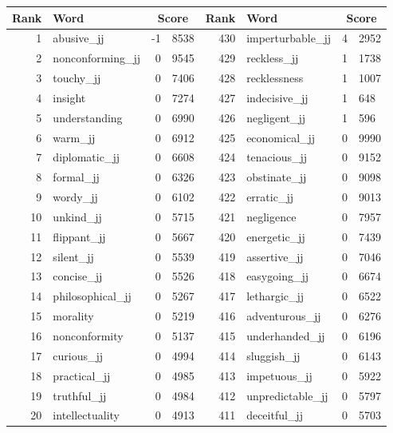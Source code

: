 \begin{table}[tbp]
    \begin{tabular}{| rlr@{.}l | rlr@{.}l |}
    \hline
    \textbf{Rank} & \textbf{Word} & \multicolumn{2}{c|}{\textbf{Score}} & \textbf{Rank} & \textbf{Word} & \multicolumn{2}{c|}{\textbf{Score}} \\
    \hline
    1 & abusive\_jj & -1 & 8538    &    430 & imperturbable\_jj & 4 & 2952 \\
    2 & nonconforming\_jj & 0 & 9545    &    429 & reckless\_jj & 1 & 1738 \\
    3 & touchy\_jj & 0 & 7406    &    428 & recklessness & 1 & 1007 \\
    4 & insight & 0 & 7274    &    427 & indecisive\_jj & 1 & 648 \\
    5 & understanding & 0 & 6990    &    426 & negligent\_jj & 1 & 596 \\
    6 & warm\_jj & 0 & 6912    &    425 & economical\_jj & 0 & 9990 \\
    7 & diplomatic\_jj & 0 & 6608    &    424 & tenacious\_jj & 0 & 9152 \\
    8 & formal\_jj & 0 & 6326    &    423 & obstinate\_jj & 0 & 9098 \\
    9 & wordy\_jj & 0 & 6102    &    422 & erratic\_jj & 0 & 9013 \\
    10 & unkind\_jj & 0 & 5715    &    421 & negligence & 0 & 7957 \\
    11 & flippant\_jj & 0 & 5667    &    420 & energetic\_jj & 0 & 7439 \\
    12 & silent\_jj & 0 & 5539    &    419 & assertive\_jj & 0 & 7046 \\
    13 & concise\_jj & 0 & 5526    &    418 & easygoing\_jj & 0 & 6674 \\
    14 & philosophical\_jj & 0 & 5267    &    417 & lethargic\_jj & 0 & 6522 \\
    15 & morality & 0 & 5219    &    416 & adventurous\_jj & 0 & 6276 \\
    16 & nonconformity & 0 & 5137    &    415 & underhanded\_jj & 0 & 6196 \\
    17 & curious\_jj & 0 & 4994    &    414 & sluggish\_jj & 0 & 6143 \\
    18 & practical\_jj & 0 & 4985    &    413 & impetuous\_jj & 0 & 5922 \\
    19 & truthful\_jj & 0 & 4984    &    412 & unpredictable\_jj & 0 & 5797 \\
    20 & intellectuality & 0 & 4913    &    411 & deceitful\_jj & 0 & 5703 \\

\end{tabular}
\end{table}
